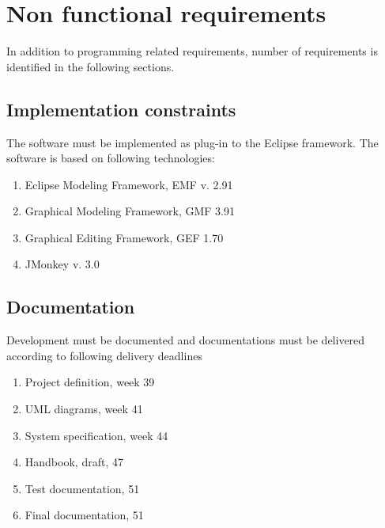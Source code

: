 \section{Non functional requirements}
In addition to programming related requirements, number of requirements is identified in the following sections.

\label{sec:non-functional}

\subsection{Implementation constraints}
The software must be implemented as plug-in to the Eclipse framework. The software is based on following technologies:
\begin{enumerate}
	\item Eclipse Modeling Framework, EMF v. 2.91
	\item Graphical Modeling Framework, GMF 3.91
	\item Graphical Editing Framework, GEF 1.70
	\item JMonkey v. 3.0
\end{enumerate}

\subsection{Documentation}
Development must be documented and documentations must be delivered according to following delivery deadlines
\begin{enumerate}
	\item Project definition, week 39
	\item UML diagrams, week 41
	\item System specification, week 44
	\item Handbook, draft, 47
	\item Test documentation, 51
	\item Final documentation, 51
\end{enumerate}

